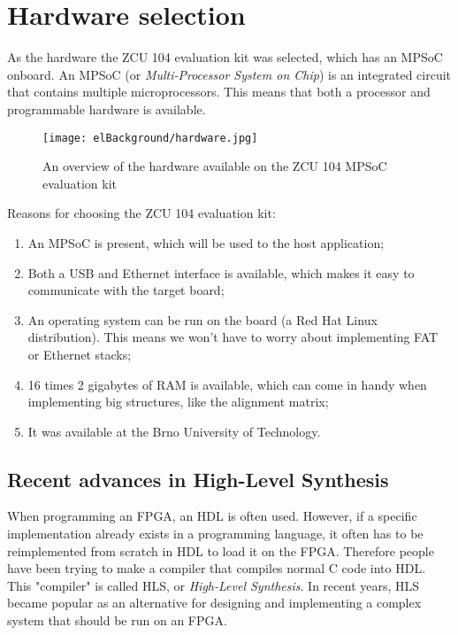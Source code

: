 \section{Hardware selection}

As the hardware the ZCU 104 evaluation kit was selected, which has an MPSoC onboard. An MPSoC (or \emph{Multi-Processor System on Chip}) is an integrated circuit that contains multiple microprocessors. This means that both a processor and programmable hardware is available.

\begin{figure}[H]
	\centering
	\texttt{[image: elBackground/hardware.jpg]}
	\caption{An overview of the hardware available on the ZCU 104 MPSoC evaluation kit}
	\label{fig:hardware}
\end{figure}

Reasons for choosing the ZCU 104 evaluation kit:
\begin{enumerate}
	\item An MPSoC is present, which will be used to the host application;
	\item Both a USB and Ethernet interface is available, which makes it easy to communicate with the target board;
	\item An operating system can be run on the board (a Red Hat Linux distribution). This means we won't have to worry about implementing FAT or Ethernet stacks;
	\item 16 times 2 gigabytes of RAM is available, which can come in handy when implementing big structures, like the alignment matrix;
	\item It was available at the Brno University of Technology.
\end{enumerate}

\subsection{Recent advances in High-Level Synthesis}

When programming an FPGA, an HDL is often used. However, if a specific implementation already exists in a programming language, it often has to be reimplemented from scratch in HDL to load it on the FPGA. Therefore people have been trying to make a compiler that compiles normal C code into HDL. This "compiler" is called HLS, or \emph{ High-Level Synthesis}. In recent years, HLS became popular as an alternative for designing and implementing a complex system that should be run on an FPGA.

